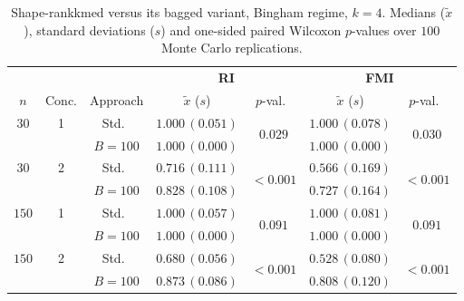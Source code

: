 \begin{table}[h]
\centering
\caption{Shape-rankkmed versus its bagged variant, Bingham regime, $k=4$. Medians ($\tilde x$), standard deviations ($s$) and one-sided paired Wilcoxon $p$-values over $100$ Monte Carlo replications.}
\label{tab:rkm-bing-k4}
\footnotesize
\begin{tabular}{cc c cc cc}
\toprule
& & & \multicolumn{2}{c}{\textbf{RI}} & \multicolumn{2}{c}{\textbf{FMI}} \\
\cmidrule(lr){4-5}\cmidrule(lr){6-7}
$n$ & Conc. & Approach & $\tilde x$ ($s$) & $p$-val.\ & $\tilde x$ ($s$) & $p$-val.\ \\
\midrule
$30$ & 1 & Std.\ & $1.000\,(0.051)$ & \multirow{2}{*}{$\mathbf{0.029}$} & $1.000\,(0.078)$ & \multirow{2}{*}{$\mathbf{0.030}$} \\
     &   & $B{=}100$ & $1.000\,(0.000)$ & & $1.000\,(0.000)$ & \\
$30$ & 2 & Std.\ & $0.716\,(0.111)$ & \multirow{2}{*}{$\mathbf{<\!0.001}$} & $0.566\,(0.169)$ & \multirow{2}{*}{$\mathbf{<\!0.001}$} \\
     &   & $B{=}100$ & $0.828\,(0.108)$ & & $0.727\,(0.164)$ & \\
$150$ & 1 & Std.\ & $1.000\,(0.057)$ & \multirow{2}{*}{$0.091$} & $1.000\,(0.081)$ & \multirow{2}{*}{$0.091$} \\
     &   & $B{=}100$ & $1.000\,(0.000)$ & & $1.000\,(0.000)$ & \\
$150$ & 2 & Std.\ & $0.680\,(0.056)$ & \multirow{2}{*}{$\mathbf{<\!0.001}$} & $0.528\,(0.080)$ & \multirow{2}{*}{$\mathbf{<\!0.001}$} \\
     &   & $B{=}100$ & $0.873\,(0.086)$ & & $0.808\,(0.120)$ & \\
\bottomrule
\end{tabular}
\end{table}

